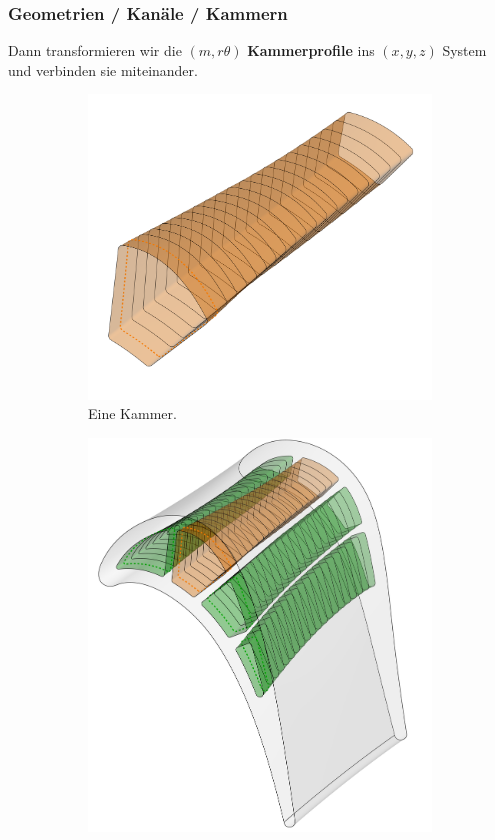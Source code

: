 \documentclass[8pt, aspectratio=169]{beamer}
\begin{document}
\begin{frame}
	\frametitle{Geometrien / Kanäle / Kammern}
	\vspace{-0.25cm}\hspace{-0.5cm}
	\centering
	\begin{minipage}[t]{\textwidth}
		Dann transformieren wir die $(m, r\theta)$ \textbf{Kammerprofile} ins $(x,y,z)$ System und verbinden sie miteinander.
		\begin{figure}[H]
			\centering
			\begin{subfigure}{.46\textwidth}
				\includegraphics[width=\textwidth]{../../tec/chambers/114.png}
				\caption{Eine Kammer.}
			\end{subfigure}
			\begin{subfigure}{.36\textwidth}
				\includegraphics[width=\textwidth]{../../tec/chambers/111.png}

\end{subfigure}
\end{figure}
\end{minipage}
\end{frame}
\end{document}
